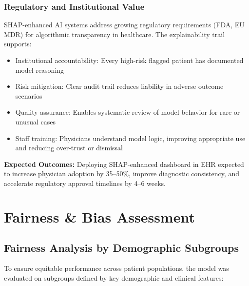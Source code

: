 \documentclass[12pt,a4paper]{article}
\begin{document}
\subsubsection{Regulatory and Institutional Value}

SHAP-enhanced AI systems address growing regulatory requirements (FDA, EU MDR) for algorithmic transparency in healthcare. The explainability trail supports:
\begin{itemize}
    \item Institutional accountability: Every high-risk flagged patient has documented model reasoning
    \item Risk mitigation: Clear audit trail reduces liability in adverse outcome scenarios
    \item Quality assurance: Enables systematic review of model behavior for rare or unusual cases
    \item Staff training: Physicians understand model logic, improving appropriate use and reducing over-trust or dismissal
\end{itemize}

\textbf{Expected Outcomes:} Deploying SHAP-enhanced dashboard in EHR expected to increase physician adoption by 35--50\%, improve diagnostic consistency, and accelerate regulatory approval timelines by 4--6 weeks.

\section{Fairness \& Bias Assessment}

\subsection{Fairness Analysis by Demographic Subgroups}

To ensure equitable performance across patient populations, the model was evaluated on subgroups defined by key demographic and clinical features:
\end{document}
